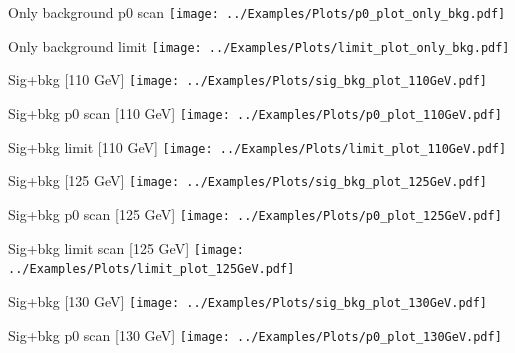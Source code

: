 \documentclass[10pt,UKenglish, leqno, xcolor = dvipsnames]{beamer}
\begin{document}
		\begin{frame}{Only background p0 scan}
			\vfill
			\texttt{[image: ../Examples/Plots/p0\_plot\_only\_bkg.pdf]}
			\vfill
		\end{frame}
	
		\begin{frame}{Only background limit}
			\vfill
			\texttt{[image: ../Examples/Plots/limit\_plot\_only\_bkg.pdf]}
			\vfill
		\end{frame}
	
		\begin{frame}{Sig+bkg [110 GeV]}
			\vfill
			\texttt{[image: ../Examples/Plots/sig\_bkg\_plot\_110GeV.pdf]}
			\vfill
		\end{frame}
	
		\begin{frame}{Sig+bkg p0 scan [110 GeV]}
			\vfill
			\texttt{[image: ../Examples/Plots/p0\_plot\_110GeV.pdf]}
			\vfill
		\end{frame}
		
		\begin{frame}{Sig+bkg limit [110 GeV]}
			\vfill
			\texttt{[image: ../Examples/Plots/limit\_plot\_110GeV.pdf]}
			\vfill
		\end{frame}
	
		\begin{frame}{Sig+bkg [125 GeV]}
			\vfill
			\texttt{[image: ../Examples/Plots/sig\_bkg\_plot\_125GeV.pdf]}
			\vfill
		\end{frame}
		
		\begin{frame}{Sig+bkg p0 scan [125 GeV]}
			\vfill
			\texttt{[image: ../Examples/Plots/p0\_plot\_125GeV.pdf]}
			\vfill
		\end{frame}
		
		\begin{frame}{Sig+bkg limit scan [125 GeV]}
			\vfill
			\texttt{[image: ../Examples/Plots/limit\_plot\_125GeV.pdf]}
			\vfill
		\end{frame}
		
		\begin{frame}{Sig+bkg [130 GeV]}
			\vfill
			\texttt{[image: ../Examples/Plots/sig\_bkg\_plot\_130GeV.pdf]}
			\vfill
		\end{frame}
		
		\begin{frame}{Sig+bkg p0 scan [130 GeV]}
			\vfill
			\texttt{[image: ../Examples/Plots/p0\_plot\_130GeV.pdf]}
			\vfill
		\end{frame}
		
\end{document}
